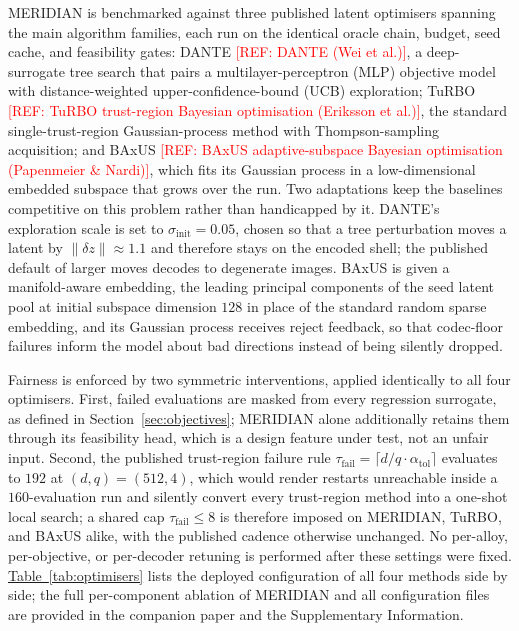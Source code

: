 \documentclass[preprint,12pt]{elsarticle}
\newcommand{\tabref}[1]{\hyperref[#1]{Table~\ref*{#1}}}
\newcommand{\refneeded}[1]{\textcolor{red}{[REF: #1]}} %
\begin{document}
MERIDIAN is benchmarked against three published latent optimisers spanning the main algorithm families, each run on the identical oracle chain, budget, seed cache, and feasibility gates: DANTE \refneeded{DANTE (Wei et al.)}, a deep-surrogate tree search that pairs a multilayer-perceptron (MLP) objective model with distance-weighted upper-confidence-bound (UCB) exploration; TuRBO \refneeded{TuRBO trust-region Bayesian optimisation (Eriksson et al.)}, the standard single-trust-region Gaussian-process method with Thompson-sampling acquisition; and BAxUS \refneeded{BAxUS adaptive-subspace Bayesian optimisation (Papenmeier \& Nardi)}, which fits its Gaussian process in a low-dimensional embedded subspace that grows over the run. Two adaptations keep the baselines competitive on this problem rather than handicapped by it. DANTE's exploration scale is set to $\sigma_{\mathrm{init}} = 0.05$, chosen so that a tree perturbation moves a latent by $\|\delta z\| \approx 1.1$ and therefore stays on the encoded shell; the published default of larger moves decodes to degenerate images. BAxUS is given a manifold-aware embedding, the leading principal components of the seed latent pool at initial subspace dimension $128$ in place of the standard random sparse embedding, and its Gaussian process receives reject feedback, so that codec-floor failures inform the model about bad directions instead of being silently dropped.

Fairness is enforced by two symmetric interventions, applied identically to all four optimisers. First, failed evaluations are masked from every regression surrogate, as defined in Section~\ref{sec:objectives}; MERIDIAN alone additionally retains them through its feasibility head, which is a design feature under test, not an unfair input. Second, the published trust-region failure rule $\tau_{\mathrm{fail}} = \lceil d/q \cdot \alpha_{\mathrm{tol}} \rceil$ evaluates to $192$ at $(d, q) = (512, 4)$, which would render restarts unreachable inside a $160$-evaluation run and silently convert every trust-region method into a one-shot local search; a shared cap $\tau_{\mathrm{fail}} \leq 8$ is therefore imposed on MERIDIAN, TuRBO, and BAxUS alike, with the published cadence otherwise unchanged. No per-alloy, per-objective, or per-decoder retuning is performed after these settings were fixed. \tabref{tab:optimisers} lists the deployed configuration of all four methods side by side; the full per-component ablation of MERIDIAN and all configuration files are provided in the companion paper {\color{red}\cite{CoPiLOT2026}} and the Supplementary Information.
\end{document}

